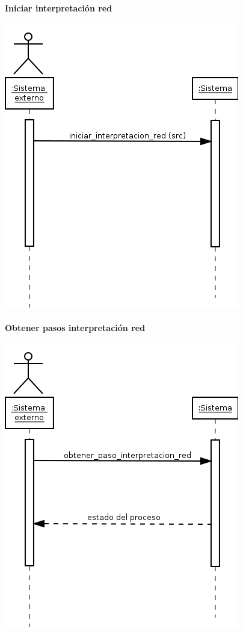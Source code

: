 \paragraph{Iniciar interpretación red}
\begin{center}
\includegraphics[scale=0.4]{iniciar_interpretacion_red.png} \\
\end{center}

\paragraph{Obtener pasos interpretación red}
\begin{center}
\includegraphics[scale=0.4]{obtener_paso_interpretacion_red.png} \\
\end{center}


